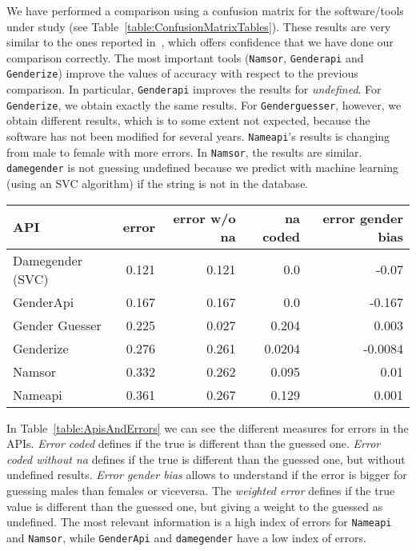 \documentclass[a4paper]{article}
\begin{document}
We have performed a comparison using a confusion matrix for the software/tools under study (see Table~\ref{table:ConfusionMatrixTables}).
These results are very similar to the ones reported in~\cite{10.7717/peerj-cs.156}, which offers confidence that we have done our comparison correctly.
The most important tools (\texttt{Namsor}, \texttt{Genderapi} and \texttt{Genderize}) improve the values of accuracy with respect to the previous comparison.
In particular, \texttt{Genderapi} improves the results for \emph{undefined}.
For \texttt{Genderize}, we obtain exactly the same results. 
For \texttt{Genderguesser}, however, we obtain different results, which is to some extent not expected, because the software has not been modified for several years.
\texttt{Nameapi}'s results is changing from male to female with more errors. 
In \texttt{Namsor}, the results are similar. 
\texttt{damegender} is not guessing undefined because we predict with machine learning (using an SVC algorithm) if the string is not in the database.

\begin{table*}
\footnotesize
\center
\begin{tabular}[]{lrrrr}
\hline
API & error & error w/o na & na coded & error gender bias\tabularnewline
\hline
Damegender (SVC)\footnotemark[1] & 0.121 & 0.121 & 0.0 & -0.07\tabularnewline
GenderApi & 0.167 & 0.167 & 0.0 & -0.167\tabularnewline
Gender Guesser & 0.225 & 0.027 & 0.204 & 0.003\tabularnewline
Genderize & 0.276 & 0.261 & 0.0204 & -0.0084 \tabularnewline 
Namsor & 0.332 & 0.262 & 0.095 & 0.01 \tabularnewline
Nameapi & 0.361 & 0.267 & 0.129 & 0.001 \tabularnewline
\hline
\end{tabular}
\caption{APIs and Errors}
\vspace{0.3cm}
\label{table:ApisAndErrors}
\end{table*}


In Table~\ref{table:ApisAndErrors} we can see the different measures for errors in the APIs.
\emph{Error coded} defines if the true is different than the guessed one. 
\emph{Error coded without na} defines if the true is different than the guessed one, but without undefined results.
\emph{Error gender bias} allows to understand if the error is bigger for guessing males than females or viceversa.
The \emph{weighted error} defines if the true value is different than the guessed one, but giving a weight to the guessed as undefined.
The most relevant information is a high index of errors for \texttt{Nameapi} and \texttt{Namsor},
while \texttt{GenderApi} and \texttt{damegender} have a low index of errors.
\end{document}
